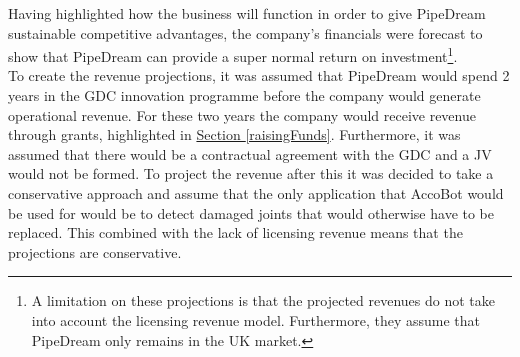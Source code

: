 \documentclass[11pt]{article}		%
\newcommand{\supercite}[1]{\textsuperscript{\cite{#1}}}		%
\newcommand{\sectref}[1]{\hyperref[#1]{Section \ref*{#1}}}     %
\begin{document}
	 Having highlighted how the business will function in order to give PipeDream sustainable competitive advantages, the company’s financials were forecast to show that PipeDream can provide a super normal return on investment\footnote{A limitation on these projections is that the projected revenues do not take into account the licensing revenue model. Furthermore, they assume that PipeDream only remains in the UK market.}.
    \\ 
    \hspace*{2ex}To create the revenue projections, it was assumed that PipeDream would spend 2 years in the GDC innovation programme before the company would generate operational revenue. For these two years the company would receive revenue through grants, highlighted in \sectref{raisingFunds}. Furthermore, it was assumed that there would be a contractual agreement with the GDC and a JV would not be formed. To project the revenue after this it was decided to take a conservative approach and assume that the only application that AccoBot would be used for would be to detect damaged joints that would otherwise have to be replaced. This combined with the lack of licensing revenue means that the projections are conservative. 
    \\ 
    \hspace*{2ex}
\end{document}
